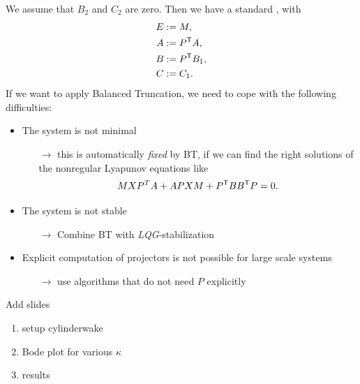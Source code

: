We assume that $B_2$ and $C_2$ are zero. Then we have a standard \eabcsys, with
\begin{align*}
	E &:= M, \\
	A &:= P^{\mathsf{T}} A, \\
	B &:= P^{\mathsf{T}} B_1, \\
	C &:= C_1 .
\end{align*}
If we want to apply Balanced Truncation, we need to cope with the following difficulties:
\begin{itemize}
	\item The system is not minimal
		\begin{itemize}
			\item[$\to$] this is automatically \emph{fixed} by BT, if we can find the right solutions of the nonregular Lyapunov equations like 
				\begin{equation*}
					MXP^TA + APXM + P^{\mathsf{T}} B B^{\mathsf{T}} P = 0.
				\end{equation*}
		\end{itemize}
	\item The system is not stable
		\begin{itemize}
			\item[$\to$] Combine BT with \emph{LQG}-stabilization \cite{morBenH15}
		\end{itemize}
	\item Explicit computation of projectors is not possible for large scale systems
		\begin{itemize}
			\item[$\to$] use algorithms that do not need $P$ explicitly \cite{morHeiSS08, morBenH15, morGugSW13}
		\end{itemize}
\end{itemize}
Add slides
\begin{enumerate}
	\item setup cylinderwake
	\item Bode plot for various $\kappa$
	\item results
\end{enumerate}

